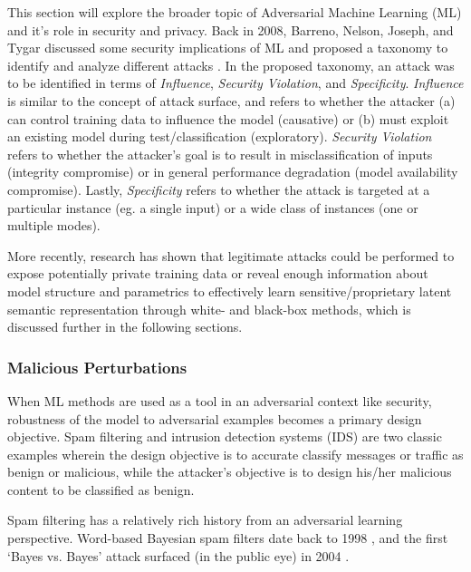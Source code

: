\documentclass[11pt]{article}
\begin{document}
This section will explore the broader topic of Adversarial Machine Learning (ML) and it's role in security and privacy.  Back in 2008, Barreno, Nelson, Joseph, and Tygar discussed some security implications of ML and proposed a taxonomy to identify and analyze different attacks \cite{barreno2010security}.  In the proposed taxonomy, an attack was to be identified in terms of \textit{Influence}, \textit{Security Violation}, and \textit{Specificity}.  \textit{Influence} is similar to the concept of attack surface, and refers to whether the attacker (a) can control training data to influence the model (causative) or (b) must exploit an existing model during test/classification (exploratory).  \textit{Security Violation} refers to whether the attacker's goal is to result in misclassification of inputs (integrity compromise) or in general performance degradation (model availability compromise).  Lastly, \textit{Specificity} refers to whether the attack is targeted at a particular instance (eg. a single input) or a wide class of instances (one or multiple modes).

More recently, research has shown that legitimate attacks could be performed to expose potentially private training data or reveal enough information about model structure and parametrics to effectively learn sensitive/proprietary latent semantic representation through white- and black-box methods, which is discussed further in the following sections.

\subsubsection{Malicious Perturbations}

When ML methods are used as a tool in an adversarial context like security, robustness of the model to adversarial examples becomes a primary design objective.  Spam filtering and intrusion detection systems (IDS) are two classic examples wherein the design objective is to accurate classify messages or traffic as benign or malicious, while the attacker's objective is to design his/her malicious content to be classified as benign.  %

Spam filtering has a relatively rich history from an adversarial learning perspective.  Word-based Bayesian spam filters date back to 1998 \cite{sahami1998bayesian}, and the first `Bayes vs. Bayes' attack surfaced (in the public eye) in 2004 \cite{graham2004beat}.
\end{document}
